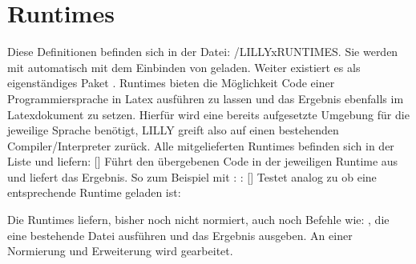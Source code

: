 
\section{Runtimes}
Diese Definitionen befinden sich in der Datei: {\ltt{}/LILLYxRUNTIMES}. Sie werden mit  automatisch mit dem Einbinden von  geladen. Weiter existiert es als eigenständiges Paket .\medskip\newline
Runtimes bieten die Möglichkeit Code einer Programmiersprache in Latex ausführen zu lassen und das Ergebnis ebenfalls im Latexdokument zu setzen. Hierfür wird eine bereits aufgesetzte Umgebung für die jeweilige Sprache benötigt, LILLY greift also auf einen bestehenden Compiler/Interpreter zurück. Alle mitgelieferten Runtimes befinden sich in der Liste  und liefern:\newline
%
%
%
[]
Führt den übergebenen Code in der jeweiligen Runtime aus und liefert das Ergebnis. So zum Beispiel mit : 
: 
%
%
%
[]
Testet analog zu  ob eine entsprechende Runtime geladen ist:
\begin{latex}
\end{latex}
%
%
%
\begin{bemerkung}
    Die Runtimes liefern, bisher noch nicht normiert, auch noch Befehle wie: , die eine bestehende Datei ausführen und das Ergebnis ausgeben. An einer Normierung und Erweiterung wird gearbeitet.
\end{bemerkung}
